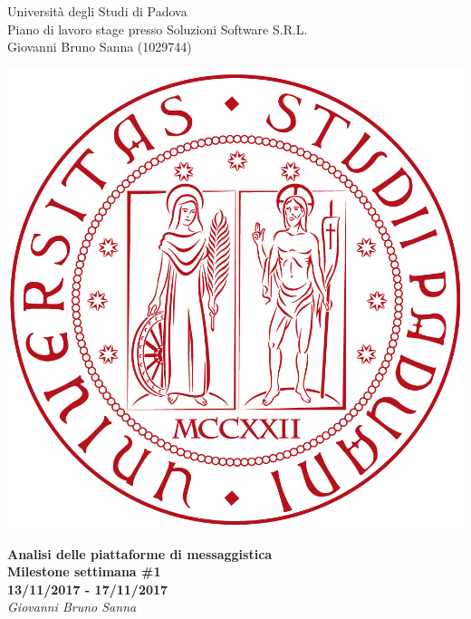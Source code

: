 \documentclass[11pt,notitlepage]{article}
\makeatletter
\newcommand{\nomeStudente}{Giovanni Bruno}
\newcommand{\cognomeStudente}{Sanna}
\newcommand{\matricolaStudente}{1029744}
\newcommand{\emailStudente}{giovannibruno.sanna@studenti.unipd.com}
\newcommand{\telStudente}{+39 0000000000}
\newcommand{\nomeTutorAziendale}{Nome}
\newcommand{\cognomeTutorAziendale}{Cognome}
\newcommand{\emailTutorAziendale}{xxtutor@azienda.it}
\newcommand{\telTutorAziendale}{+39 0000000000}
\newcommand{\ragioneSocAzienda}{Soluzioni Software S.R.L.}
\newcommand{\indirizzoAzienda}{Via Via dei Ronchi, 21, 35127 Padova (PD)}
\newcommand{\sitoAzienda}{http://www.soluzioni-sw.it/}
\makeatother
\begin{document}
	
\noindent
\parbox{0.7\columnwidth}{Università degli Studi di Padova\\
	Piano di lavoro stage presso \ragioneSocAzienda{}\\
	\nomeStudente{} \cognomeStudente{} (\matricolaStudente{})}%
\parbox{0.3\columnwidth}{
	\hfill \includegraphics[scale=0.08]{immagini/logo-unipd.png}}

\bigskip
\begin{center}
{\Huge \textbf{Analisi delle piattaforme di messaggistica}}\\ \bigskip
{\textbf{Milestone settimana \#1  \\   13/11/2017 - 17/11/2017}} \\ \bigskip
	{\Large \textit{\nomeStudente{} \cognomeStudente{}}}
\end{center}

\bigskip
\end{document}
